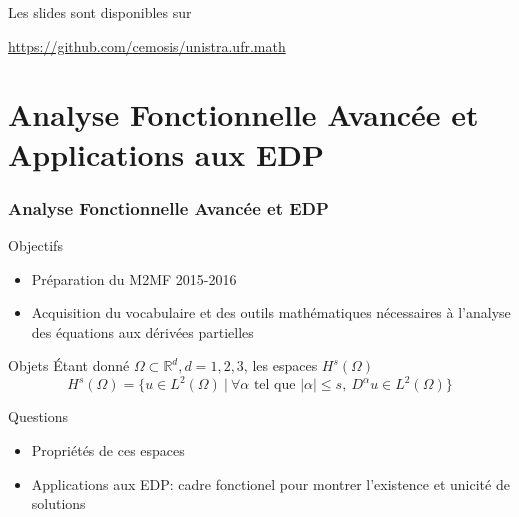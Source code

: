 \documentclass{beamer}
\begin{document}
\begin{frame}
  Les slides sont disponibles sur
  \begin{center}
    \centerline{\url{https://github.com/cemosis/unistra.ufr.math}}
  \end{center}
\end{frame}

\section{Analyse Fonctionnelle Avancée et Applications aux EDP}

\begin{frame}\frametitle{Analyse Fonctionnelle Avancée et  EDP}
  \begin{block}{Objectifs}
    \begin{itemize}
    \item Préparation du M2MF 2015-2016
    \item Acquisition du vocabulaire et des outils mathématiques nécessaires à
      l'analyse des équations aux dérivées partielles
    \end{itemize}
  \end{block}
  \begin{block}{Objets}
    Étant donné $\Omega \subset \mathbb{R}^d, d=1,2,3$, les espaces $H^s(\Omega)$
    \begin{equation*}
      H^s(\Omega)=\{ u \in L^2(\Omega)~|~\forall\alpha\text{ tel que }|\alpha|\le s,~D^\alpha u\in L^2(\Omega)\}
    \end{equation*}
  \end{block}
  \begin{block}{Questions}
    \begin{itemize}
    \item Propriétés de ces espaces
    \item Applications aux EDP: cadre fonctionel pour montrer
      l'existence et unicité de solutions
    \end{itemize}
  \end{block}
\end{frame}
\end{document}
